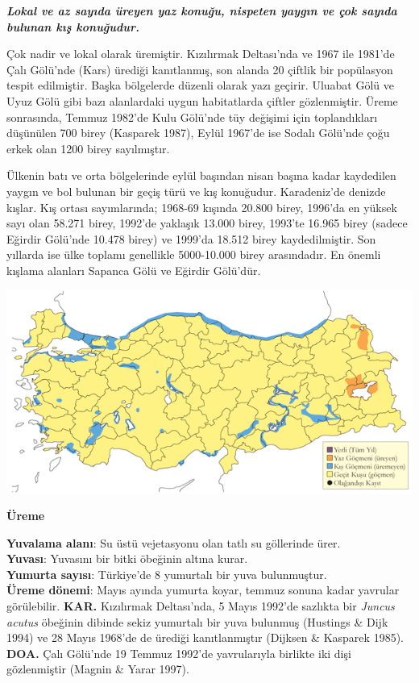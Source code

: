 \documentclass[
  letterpaper,
  DIV=11,
  numbers=noendperiod]{scrreprt}
\begin{document}
\textbf{\emph{Lokal ve az sayıda üreyen yaz konuğu, nispeten yaygın ve
çok sayıda bulunan kış konuğudur.}}

Çok nadir ve lokal olarak üremiştir. Kızılırmak Deltası'nda ve 1967 ile
1981'de Çalı Gölü'nde (Kars) ürediği kanıtlanmış, son alanda 20 çiftlik
bir popülasyon tespit edilmiştir. Başka bölgelerde düzenli olarak yazı
geçirir. Uluabat Gölü ve Uyuz Gölü gibi bazı alanlardaki uygun
habitatlarda çiftler gözlenmiştir. Üreme sonrasında, Temmuz 1982'de Kulu
Gölü'nde tüy değişimi için toplandıkları düşünülen 700 birey (Kasparek
1987), Eylül 1967'de ise Sodalı Gölü'nde çoğu erkek olan 1200 birey
sayılmıştır.

Ülkenin batı ve orta bölgelerinde eylül başından nisan başına kadar
kaydedilen yaygın ve bol bulunan bir geçiş türü ve kış konuğudur.
Karadeniz'de denizde kışlar. Kış ortası sayımlarında; 1968-69 kışında
20.800 birey, 1996'da en yüksek sayı olan 58.271 birey, 1992'de yaklaşık
13.000 birey, 1993'te 16.965 birey (sadece Eğirdir Gölü'nde 10.478
birey) ve 1999'da 18.512 birey kaydedilmiştir. Son yıllarda ise ülke
toplamı genellikle 5000-10.000 birey arasındadır. En önemli kışlama
alanları Sapanca Gölü ve Eğirdir Gölü'dür.

\includegraphics{images/harita_Page_025.png}

\textbf{Üreme}

\textbf{Yuvalama alanı}: Su üstü vejetasyonu olan tatlı su göllerinde
ürer.\\
\textbf{Yuvası}: Yuvasını bir bitki öbeğinin altına kurar.\\
\textbf{Yumurta sayısı}: Türkiye'de 8 yumurtalı bir yuva bulunmuştur.\\
\textbf{Üreme dönemi}: Mayıs ayında yumurta koyar, temmuz sonuna kadar
yavrular görülebilir. \textbf{KAR.} Kızılırmak Deltası'nda, 5 Mayıs
1992'de sazlıkta bir \emph{Juncus acutus} öbeğinin dibinde sekiz
yumurtalı bir yuva bulunmuş (Hustings \& Dijk 1994) ve 28 Mayıs 1968'de
de ürediği kanıtlanmıştır (Dijksen \& Kasparek 1985). \textbf{DOA.} Çalı
Gölü'nde 19 Temmuz 1992'de yavrularıyla birlikte iki dişi gözlenmiştir
(Magnin \& Yarar 1997).
\end{document}
